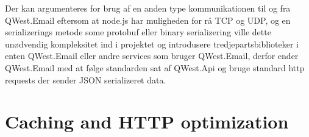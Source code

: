 Der kan argumenteres for brug af en anden type kommunikationen til og fra QWest.Email eftersom at node.js har muligheden for rå TCP og UDP, og en serializerings metode some protobuf \cite{ProtoBuf} eller binary serializering \cite{CsharpBinarySerialization} ville dette unødvendig kompleksitet ind i projektet og introdusere tredjepartsbiblioteker i enten QWest.Email eller andre services som bruger QWest.Email, derfor ender QWest.Email med at følge standarden sat af QWest.Api og bruge standard http requests der sender JSON serializeret data.

\section{Caching and HTTP optimization}\label{sec:caching}
